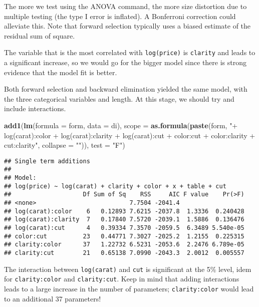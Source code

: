 \documentclass[]{book}
\newenvironment{Shaded}{\begin{snugshade}}{\end{snugshade}}
\newcommand{\DataTypeTok}[1]{\textcolor[rgb]{0.13,0.29,0.53}{#1}}
\newcommand{\KeywordTok}[1]{\textcolor[rgb]{0.13,0.29,0.53}{\textbf{#1}}}
\newcommand{\NormalTok}[1]{#1}
\newcommand{\StringTok}[1]{\textcolor[rgb]{0.31,0.60,0.02}{#1}}
\theoremstyle{definition}
\theoremstyle{definition}
\theoremstyle{definition}
\theoremstyle{remark}
\begin{document}
The more we test using the ANOVA command, the more size distortion due
to multiple testing (the type I error is inflated). A Bonferroni
correction could alleviate this. Note that forward selection typically
uses a biased estimate of the residual sum of square.

The variable that is the most correlated with \texttt{log(price)} is
\texttt{clarity} and leads to a significant increase, so we would go for
the bigger model since there is strong evidence that the model fit is
better.

Both forward selection and backward elimination yielded the same model,
with the three categorical variables and length. At this stage, we
should try and include interactions.

\begin{Shaded}
\begin{Highlighting}[]
\KeywordTok{add1}\NormalTok{(}\KeywordTok{lm}\NormalTok{(}\DataTypeTok{formula =}\NormalTok{ form, }\DataTypeTok{data =}\NormalTok{ di),}
        \DataTypeTok{scope =}  \KeywordTok{as.formula}\NormalTok{(}\KeywordTok{paste}\NormalTok{(form, }\StringTok{"+ log(carat):color + log(carat):clarity + }
\StringTok{                                  log(carat):cut + color:cut + color:clarity + cut:clarity"}\NormalTok{, }\DataTypeTok{collapse =} \StringTok{""}\NormalTok{)),}
     \DataTypeTok{test =} \StringTok{"F"}\NormalTok{)}
\end{Highlighting}
\end{Shaded}

\begin{verbatim}
## Single term additions
## 
## Model:
## log(price) ~ log(carat) + clarity + color + x + table + cut
##                    Df Sum of Sq    RSS     AIC F value    Pr(>F)
## <none>                          7.7504 -2041.4                  
## log(carat):color    6   0.12893 7.6215 -2037.8  1.3336  0.240428
## log(carat):clarity  7   0.17840 7.5720 -2039.1  1.5886  0.136476
## log(carat):cut      4   0.39334 7.3570 -2059.5  6.3489 5.540e-05
## color:cut          23   0.44771 7.3027 -2025.2  1.2155  0.225315
## clarity:color      37   1.22732 6.5231 -2053.6  2.2476 6.789e-05
## clarity:cut        21   0.65138 7.0990 -2043.3  2.0012  0.005557
\end{verbatim}

The interaction between \texttt{log(carat)} and \texttt{cut} is
significant at the 5\% level, idem for \texttt{clarity:color} and
\texttt{clarity:cut}. Keep in mind that adding interactions leads to a
large increase in the number of parameters; \texttt{clarity:color} would
lead to an additional 37 parameters!
\end{document}
